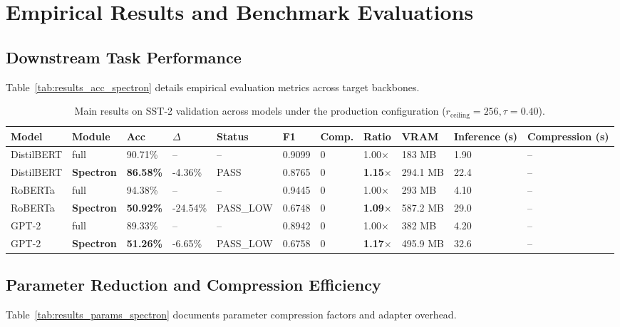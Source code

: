 \section{Empirical Results and Benchmark Evaluations}

\subsection{Downstream Task Performance}
Table~\ref{tab:results_acc_spectron} details empirical evaluation metrics across target backbones.

\begin{table}[t]
\centering
\small
\begin{tabular}{lllllllllll}
\toprule
\textbf{Model} & \textbf{Module} & \textbf{Acc} & \textbf{$\Delta$} & \textbf{Status} & \textbf{F1} & \textbf{Comp.} & \textbf{Ratio} & \textbf{VRAM} & \textbf{Inference (s)} & \textbf{Compression (s)} \\
\midrule
DistilBERT & full & 90.71\% & -- & -- & 0.9099 & 0 & 1.00$\times$ & 183 MB & 1.90 & -- \\
DistilBERT & \textbf{Spectron} & \textbf{86.58\%} & -4.36\% & PASS & 0.8765 & 0 & \textbf{1.15$\times$} & 294.1 MB & 22.4 & -- \\
RoBERTa & full & 94.38\% & -- & -- & 0.9445 & 0 & 1.00$\times$ & 293 MB & 4.10 & -- \\
RoBERTa & \textbf{Spectron} & \textbf{50.92\%} & -24.54\% & PASS_LOW & 0.6748 & 0 & \textbf{1.09$\times$} & 587.2 MB & 29.0 & -- \\
GPT-2 & full & 89.33\% & -- & -- & 0.8942 & 0 & 1.00$\times$ & 382 MB & 4.20 & -- \\
GPT-2 & \textbf{Spectron} & \textbf{51.26\%} & -6.65\% & PASS_LOW & 0.6758 & 0 & \textbf{1.17$\times$} & 495.9 MB & 32.6 & -- \\
\bottomrule
\end{tabular}
\caption{Main results on SST-2 validation across models under the production configuration ($r_{\mathrm{ceiling}}=256, \tau=0.40$).}
\label{tab:main_sst2}
\end{table}

\subsection{Parameter Reduction and Compression Efficiency}
Table~\ref{tab:results_params_spectron} documents parameter compression factors and adapter overhead.

